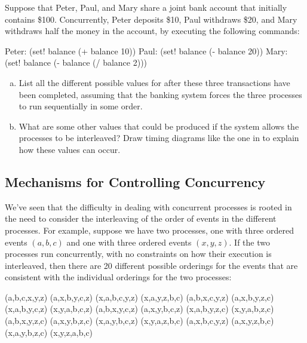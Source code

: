 \begin{exerciseGroup}
\label{Exercise 3.38}
 Suppose that Peter, Paul, and
Mary share a joint bank account that initially contains \$100.  Concurrently,
Peter deposits \$10, Paul withdraws \$20, and Mary withdraws half the money in
the account, by executing the following commands:

\begin{codeBlock}
Peter: (set! balance (+ balance 10))
Paul:  (set! balance (- balance 20))
Mary:  (set! balance (- balance (/ balance 2)))
\end{codeBlock}

\begin{enumerate}[a.]

\item
List all the different possible values for  after these three
transactions have been completed, assuming that the banking system forces the
three processes to run sequentially in some order.

\item
What are some other values that could be produced if the system allows the
processes to be interleaved?  Draw timing diagrams like the one in 
to explain how these values can occur.

\end{enumerate}
\end{exerciseGroup}

\subsection{Mechanisms for Controlling Concurrency}
\label{Section 3.4.2}

We've seen that the difficulty in dealing with concurrent processes is rooted
in the need to consider the interleaving of the order of events in the
different processes.  For example, suppose we have two processes, one with
three ordered events \( (a, b, c) \) and one with three ordered events
\( (x, y, z) \).  If the two processes run concurrently, with no
constraints on how their execution is interleaved, then there are 20 different
possible orderings for the events that are consistent with the individual
orderings for the two processes:

\begin{example}
(a,b,c,x,y,z)  (a,x,b,y,c,z)  (x,a,b,c,y,z)  (x,a,y,z,b,c)
(a,b,x,c,y,z)  (a,x,b,y,z,c)  (x,a,b,y,c,z)  (x,y,a,b,c,z)
(a,b,x,y,c,z)  (a,x,y,b,c,z)  (x,a,b,y,z,c)  (x,y,a,b,z,c)
(a,b,x,y,z,c)  (a,x,y,b,z,c)  (x,a,y,b,c,z)  (x,y,a,z,b,c)
(a,x,b,c,y,z)  (a,x,y,z,b,c)  (x,a,y,b,z,c)  (x,y,z,a,b,c)
\end{example}

